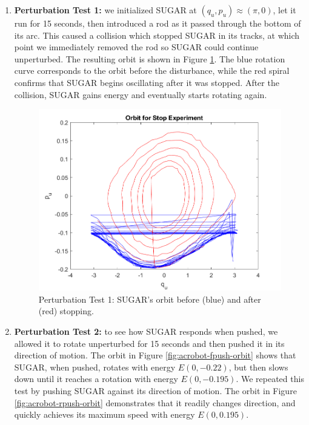 \documentclass[journal,twoside,onecolumn,draftclsnofoot,web]{ieeecolor}
\begin{document}
{\begin{enumerate}
\item \textbf{Perturbation Test 1:}
    we initialized SUGAR at 
    \((q_u,p_u) \approx \left(\pi,0\right)\), let it run for 15
    seconds, then introduced a rod as it passed through the bottom of
    its arc.
    This caused a collision which stopped SUGAR in its tracks, at which
    point we immediately removed the rod so SUGAR could continue
    unperturbed.
    The resulting orbit is shown in Figure \ref{fig:acrobot-stopped-orbit}.
    The blue rotation curve corresponds to the orbit before the disturbance,
    while the red spiral confirms that SUGAR begins oscillating after it
    was stopped.  
    After the collision, SUGAR gains energy and eventually starts
    rotating again.

\begin{figure}
    \centering
    \includegraphics[width=0.8\linewidth]{acrobot_stopped_orbit.png}
    \caption{Perturbation Test 1: SUGAR's orbit before (blue) and after (red) stopping.}
    \label{fig:acrobot-stopped-orbit}
\end{figure}


\item \textbf{Perturbation Test 2:}
    to see how SUGAR responds when pushed, we allowed
    it to rotate unperturbed for 15 seconds and then pushed it in its
    direction of motion.
    The orbit in Figure \ref{fig:acrobot-fpush-orbit} shows that SUGAR,
    when pushed, rotates with energy \(E(0,-0.22)\), but then slows down until
    it reaches a rotation with energy \(E(0,-0.195)\).
    We repeated this test by pushing SUGAR against its direction of motion.
    The orbit in Figure \ref{fig:acrobot-rpush-orbit} demonstrates that it
    readily changes direction, and quickly achieves its maximum speed
    with energy \(E(0,0.195)\).
\end{enumerate}

}
\end{document}
